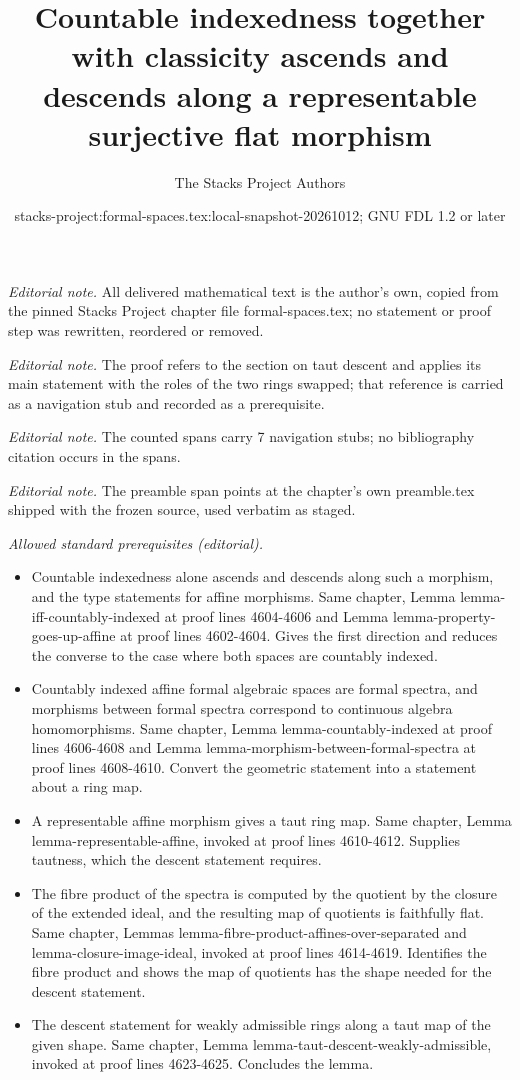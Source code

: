 \documentclass{stacks-project}
\title{Countable indexedness together with classicity ascends and descends along a representable surjective flat morphism}
\author{The Stacks Project Authors}
\date{stacks-project:formal-spaces.tex:local-snapshot-20261012; GNU FDL 1.2 or later}
\theoremstyle{plain}
\theoremstyle{definition}
\theoremstyle{remark}
\numberwithin{equation}{subsection}
\begin{document}
\maketitle
\noindent\textit{Editorial note.} All delivered mathematical text is the author's own, copied from the pinned Stacks Project chapter file formal-spaces.tex; no statement or proof step was rewritten, reordered or removed.\par\medskip
\noindent\textit{Editorial note.} The proof refers to the section on taut descent and applies its main statement with the roles of the two rings swapped; that reference is carried as a navigation stub and recorded as a prerequisite.\par\medskip
\noindent\textit{Editorial note.} The counted spans carry 7 navigation stubs; no bibliography citation occurs in the spans.\par\medskip
\noindent\textit{Editorial note.} The preamble span points at the chapter's own preamble.tex shipped with the frozen source, used verbatim as staged.\par\medskip
\noindent\textit{Allowed standard prerequisites (editorial).}\begin{itemize}
\item Countable indexedness alone ascends and descends along such a morphism, and the type statements for affine morphisms. Same chapter, Lemma lemma-iff-countably-indexed at proof lines 4604-4606 and Lemma lemma-property-goes-up-affine at proof lines 4602-4604. Gives the first direction and reduces the converse to the case where both spaces are countably indexed.
\item Countably indexed affine formal algebraic spaces are formal spectra, and morphisms between formal spectra correspond to continuous algebra homomorphisms. Same chapter, Lemma lemma-countably-indexed at proof lines 4606-4608 and Lemma lemma-morphism-between-formal-spectra at proof lines 4608-4610. Convert the geometric statement into a statement about a ring map.
\item A representable affine morphism gives a taut ring map. Same chapter, Lemma lemma-representable-affine, invoked at proof lines 4610-4612. Supplies tautness, which the descent statement requires.
\item The fibre product of the spectra is computed by the quotient by the closure of the extended ideal, and the resulting map of quotients is faithfully flat. Same chapter, Lemmas lemma-fibre-product-affines-over-separated and lemma-closure-image-ideal, invoked at proof lines 4614-4619. Identifies the fibre product and shows the map of quotients has the shape needed for the descent statement.
\item The descent statement for weakly admissible rings along a taut map of the given shape. Same chapter, Lemma lemma-taut-descent-weakly-admissible, invoked at proof lines 4623-4625. Concludes the lemma.
\end{itemize}\medskip
\end{document}
